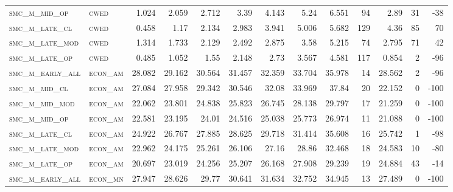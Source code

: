 \begin{landscape}
\begin{center}
\begin{footnotesize}
\begin{longtable}{llrrrrrrrr|rrr}
\textsc{smc\_m\_mid\_op   } & \textsc{cwed      }   & 1.024    & 2.059    & 2.712    & 3.39     & 4.143    & 5.24     & 6.551    & 94     & 2.89          & 31            & -38             \\
\textsc{smc\_m\_late\_cl  } & \textsc{cwed      }   & 0.458    & 1.17     & 2.134    & 2.983    & 3.941    & 5.006    & 5.682    & 129    & 4.36          & 85            & 70              \\
\textsc{smc\_m\_late\_mod } & \textsc{cwed      }   & 1.314    & 1.733    & 2.129    & 2.492    & 2.875    & 3.58     & 5.215    & 74     & 2.795         & 71            & 42              \\
\textsc{smc\_m\_late\_op  } & \textsc{cwed      }   & 0.485    & 1.052    & 1.55     & 2.148    & 2.73     & 3.567    & 4.581    & 117    & 0.854         & 2             & -96             \\
\textsc{smc\_m\_early\_all} & \textsc{econ\_am  }   & 28.082   & 29.162   & 30.564   & 31.457   & 32.359   & 33.704   & 35.978   & 14     & 28.562        & 2             & -96             \\
\textsc{smc\_m\_mid\_cl   } & \textsc{econ\_am  }   & 27.084   & 27.958   & 29.342   & 30.546   & 32.08    & 33.969   & 37.84    & 20     & 22.152        & 0             & -100            \\
\textsc{smc\_m\_mid\_mod  } & \textsc{econ\_am  }   & 22.062   & 23.801   & 24.838   & 25.823   & 26.745   & 28.138   & 29.797   & 17     & 21.259        & 0             & -100            \\
\textsc{smc\_m\_mid\_op   } & \textsc{econ\_am  }   & 22.581   & 23.195   & 24.01    & 24.516   & 25.038   & 25.773   & 26.974   & 11     & 21.088        & 0             & -100            \\
\textsc{smc\_m\_late\_cl  } & \textsc{econ\_am  }   & 24.922   & 26.767   & 27.885   & 28.625   & 29.718   & 31.414   & 35.608   & 16     & 25.742        & 1             & -98             \\
\textsc{smc\_m\_late\_mod } & \textsc{econ\_am  }   & 22.962   & 24.175   & 25.261   & 26.106   & 27.16    & 28.86    & 32.468   & 18     & 24.583        & 10            & -80             \\
\textsc{smc\_m\_late\_op  } & \textsc{econ\_am  }   & 20.697   & 23.019   & 24.256   & 25.207   & 26.168   & 27.908   & 29.239   & 19     & 24.884        & 43            & -14             \\
\textsc{smc\_m\_early\_all} & \textsc{econ\_mn  }   & 27.947   & 28.626   & 29.77    & 30.641   & 31.634   & 32.752   & 34.945   & 13     & 27.489        & 0             & -100            \\

\end{longtable}
\end{footnotesize}
\end{center}
\end{landscape}
